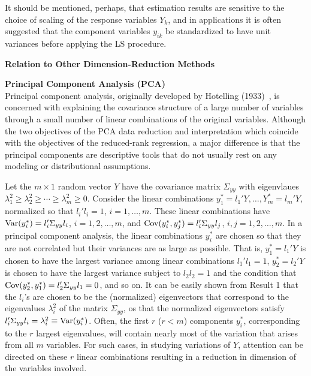 It should be mentioned, perhaps, that estimation results are sensitive to the choice of scaling of the response variables $Y_k$, and in applications it is often suggested that the component variables $y_{ik}$ be standardized to have unit variances before applying the LS procedure. \\


\begin{center} \textbf{Relation to Other Dimension-Reduction Methods} \end{center} \vspace{0.5cm}


\noindent\textbf{Principal Component Analysis (PCA)} \\


\noindent Principal component analysis, originally developed by Hotelling (1933)~\cite{hotelling33}, is concerned with explaining the covariance structure of a large number of variables through a small number of linear combinations of the original variables. Although the two objectives of the PCA data reduction and interpretation which coincide with the objectives of the reduced-rank regression, a major difference is that the principal components are descriptive tools that do not usually rest on any modeling or distributional assumptions. 


Let the $m \times 1$ random vector $Y$ have the covariance matrix $\Sigma_{yy}$ with eigenvlaues $\lambda_1^2 \geq \lambda_2^2 \geq \cdots \geq \lambda_m^2 \geq 0$. Consider the linear combinations $y_1^*= l_1' Y, \ldots, Y_m^* = l_m' Y$, normalized so that $l_i' l_i=1$, $i=1, \ldots, m$. These linear combinations have $\operatorname{Var}(y_i^*)= l_i' \Sigma_{yy} l_i$, $i= 1, 2, \ldots, m$, and $\operatorname{Cov}(y_i^*,y_j^*)= l_i' \Sigma_{yy} l_j$, $i,j= 1, 2, \ldots, m$. In a principal component analysis, the linear combinations $y_i^*$ are chosen so that they are not correlated but their variances are as large as possible. That is, $y_1^*= l_1' Y$ is chosen to have the largest variance among linear combinations $l_1' l_1= 1$, $y_2^*= l_2' Y$ is chosen to have the largest variance subject to $l_2 l_2=1$ and the condition that $\operatorname{Cov}(y_2^*,y_1^*)= l_2' \Sigma_{yy}l_1=0$, and so on. It can be easily shown from Result 1 that the $l_i$'s are chosen to be the (normalized) eigenvectors that correspond to the eigenvalues $\lambda_i^2$ of the matrix $\Sigma_{yy}$, os that the normalized eigenvectors satisfy $l_i' \Sigma_{yy}l_i= \lambda_i^2 \equiv \operatorname{Var}(y_i^*)$. Often, the first $r$ ($r<m$) components $y_i^*$, corresponding to the $r$ largest eigenvalues, will contain nearly most of the variation that arises from all $m$ variables. For such cases, in studying variations of $Y$, attention can be directed on these $r$ linear combinations resulting in a reduction in dimension of the variables involved. 


